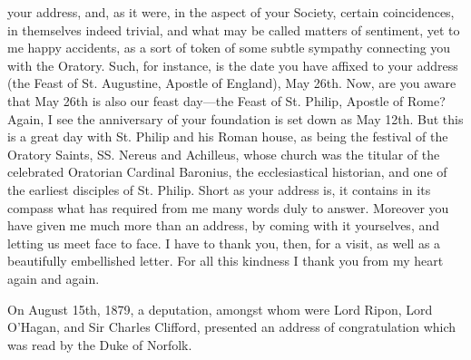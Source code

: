 your address, and, as it were, in the aspect of your Society, certain
coincidences, in themselves indeed trivial, and what may be called
matters of sentiment, yet to me happy accidents, as a sort of token of
some subtle sympathy connecting you with the Oratory. Such, for
instance, is the date you have affixed to your address (the Feast of
St. Augustine, Apostle of England), May 26th. Now, are you aware that
May 26th is also our feast day—the Feast of St. Philip, Apostle of
Rome? Again, I see the anniversary of your foundation is set down as
May 12th. But this is a great day with St. Philip and his Roman house,
as being the festival of the Oratory Saints, SS. Nereus and Achilleus,
whose church was the titular of the celebrated Oratorian Cardinal
Baronius, the ecclesiastical historian, and one of the earliest
disciples of St. Philip. Short as your address is, it contains in its
compass what has required from me many words duly to answer. Moreover
you have given me much more than an address, by coming with it
yourselves, and letting us meet face to face. I have to thank you,
then, for a visit, as well as a beautifully embellished letter. For
all this kindness I thank you from my heart again and again.


On August 15th, 1879, a deputation, amongst whom
were Lord Ripon, Lord O'Hagan, and Sir Charles Clifford, presented an
address of congratulation which was read by the Duke of Norfolk.

